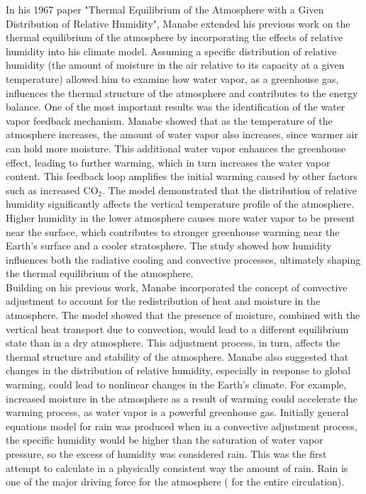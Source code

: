 In his 1967 paper "Thermal Equilibrium of the Atmosphere with a Given Distribution of Relative Humidity", Manabe extended his previous work on the thermal equilibrium of the atmosphere by incorporating the effects of relative humidity into his climate model. Assuming a specific distribution of relative humidity (the amount of moisture in the air relative to its capacity at a given temperature) allowed him to examine how water vapor, as a greenhouse gas, influences the thermal structure of the atmosphere and contributes to the energy balance. One of the most important results was the identification of the water vapor feedback mechanism. Manabe showed that as the temperature of the atmosphere increases, the amount of water vapor also increases, since warmer air can hold more moisture. This additional water vapor enhances the greenhouse effect, leading to further warming, which in turn increases the water vapor content. This feedback loop amplifies the initial warming caused by other factors such as increased CO$_2$. The model demonstrated that the distribution of relative humidity significantly affects the vertical temperature profile of the atmosphere. Higher humidity in the lower atmosphere causes more water vapor to be present near the surface, which contributes to stronger greenhouse warming near the Earth's surface and a cooler stratosphere. The study showed how humidity influences both the radiative cooling and convective processes, ultimately shaping the thermal equilibrium of the atmosphere.\\

Building on his previous work, Manabe incorporated the concept of convective adjustment to account for the redistribution of heat and moisture in the atmosphere. The model showed that the presence of moisture, combined with the vertical heat transport due to convection, would lead to a different equilibrium state than in a dry atmosphere. This adjustment process, in turn, affects the thermal structure and stability of the atmosphere. Manabe also suggested that changes in the distribution of relative humidity, especially in response to global warming, could lead to nonlinear changes in the Earth’s climate. For example, increased moisture in the atmosphere as a result of warming could accelerate the warming process, as water vapor is a powerful greenhouse gas.
Initially general equations model for rain was produced when in a convective adjustment process, the specific humidity would be higher than the saturation of water vapor pressure, so the excess of humidity was considered rain. This was the first attempt to calculate in a physically consistent way the amount of rain. Rain is one of the major driving force for the atmosphere ( for the entire circulation).